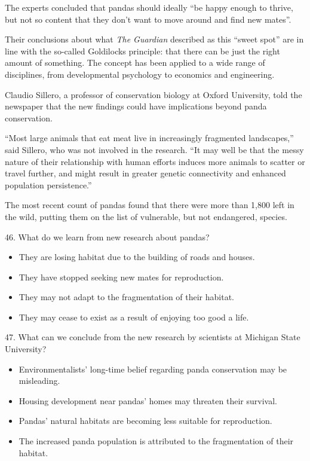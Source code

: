 \documentclass[UTF8,11pt]{ctexart}
\begin{document}
The experts concluded that pandas should ideally “be happy enough to thrive, but not so content that they don’t want to move around and find new mates”.


Their conclusions about what \textit{The Guardian} described as this “sweet spot” are in line with the so-called Goldilocks principle: that there can be just the right amount of something. The concept has been applied to a wide range of disciplines, from developmental psychology to economics and engineering.


Claudio Sillero, a professor of conservation biology at Oxford University, told the newspaper that the new findings could have implications beyond panda conservation.


“Most large animals that eat meat live in increasingly fragmented landscapes,” said Sillero, who was not involved in the research. “It may well be that the messy nature of their relationship with human efforts induces more animals to scatter or travel further, and might result in greater genetic connectivity and enhanced population persistence.”


The most recent count of pandas found that there were more than 1,800 left in the wild, putting them on the list of vulnerable, but not endangered, species.


46. What do we learn from new research about pandas?


\begin{itemize}[leftmargin=2em,itemsep=.2em,topsep=.4em]\item[A.] They are losing habitat due to the building of roads and houses.
\item[B.] They have stopped seeking new mates for reproduction.
\item[C.] They may not adapt to the fragmentation of their habitat.
\item[D.] They may cease to exist as a result of enjoying too good a life.
\end{itemize}

47. What can we conclude from the new research by scientists at Michigan State University?


\begin{itemize}[leftmargin=2em,itemsep=.2em,topsep=.4em]\item[A.] Environmentalists’ long-time belief regarding panda conservation may be misleading.
\item[B.] Housing development near pandas’ homes may threaten their survival.
\item[C.] Pandas’ natural habitats are becoming less suitable for reproduction.
\item[D.] The increased panda population is attributed to the fragmentation of their habitat.
\end{itemize}
\end{document}
